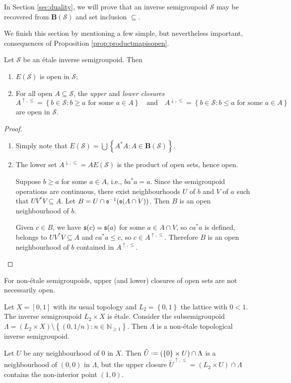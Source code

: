 In Section \ref{sec:duality}, we will prove that an inverse semigroupoid $\mathcal{S}$ may be recovered from $\mathbf{B}(\mathcal{S})$ and set inclusion $\subseteq$.

We finish this section by mentioning a few simple, but nevertheless important, consequences of Proposition \ref{prop:productmapisopen}.

\begin{corollary}\label{cor:propertiesopeninversesemigroupoid}
Let $\mathcal{S}$ be an étale inverse semigroupoid. Then
\begin{enumerate}[label=(\alph*)]
    \item\label{cor:propertiesopeninversesemigroupoid1} $E(\mathcal{S})$ is open in  $\mathcal{S}$;
    \item\label{cor:propertiesopeninversesemigroupoid2} For all open $A\subseteq \mathcal{S}$, the \emph{upper} and \emph{lower closures} \[A^{\uparrow,\leq}=\left\{b\in\mathcal{S}:b\geq a\text{ for some }a\in A\right\}\quad\text{and}\quad A^{\downarrow,\leq}=\left\{b\in\mathcal{S}:b\leq a\text{ for some }a\in A\right\}\]
    are open in $\mathcal{S}$.
\end{enumerate}
\end{corollary}
\begin{proof}
\begin{enumerate}[label=(\alph*)]
    \item Simply note that $E(\mathcal{S})=\bigcup\left\{A^*A:A\in \mathbf{B}(\mathcal{S})\right\}$.
    \item The lower set $A^{\downarrow,\leq}=AE(\mathcal{S})$ is the product of open sets, hence open.
    
    Suppose $b\geq a$ for some $a\in A$, i.e., $ba^*a=a$. Since the semigroupoid operations are continuous, there exist neighbourhoods $U$ of $b$ and $V$ of $a$ such that $UV^*V\subseteq A$. Let $B=U\cap\operatorname{\mathfrak{s}}^{-1}(\operatorname{\mathfrak{s}}(A\cap V))$. Then $B$ is an open neighbourhood of $b$.
    
    Given $c\in B$, we have $\operatorname{\mathfrak{s}}(c)=\operatorname{\mathfrak{s}}(a)$ for some $a\in A\cap V$, so $ca^*a$ is defined, belongs to $UV^*V\subseteq A$ and $ca^*a\leq c$, so $c\in A^{\uparrow,\leq}$. Therefore $B$ is an open neighbourhood of $b$ contained in $A^{\uparrow,\leq}$.\qedhere
\end{enumerate}
\end{proof}

\begin{example}
    For non-étale semigroupoids, upper (and lower) closures of open sets are not necessarily open.

    Let $X=[0,1]$ with its usual topology and $L_2=\left\{0,1\right\}$ the lattice with $0<1$. The inverse semigroupoid $L_2\times X$ is étale. Consider the subsemigroupoid $\Lambda=(L_2\times X)\setminus\left\{(0,1/n):n\in\mathbb{N}_{\geq 1}\right\}$. Then $\Lambda$ is a non-étale topological inverse semigroupoid.

    Let $U$ be any neighbourhood of $0$ in $X$. Then $\tilde{U}\defeq(\left\{0\right\}\times U)\cap\Lambda$ is a neighbourhood of $(0,0)$ in $\Lambda$, but the upper closure $\tilde{U}^{\uparrow,\leq}=(L_2\times U)\cap\Lambda$ contains the non-interior point $(1,0)$.
\end{example}

